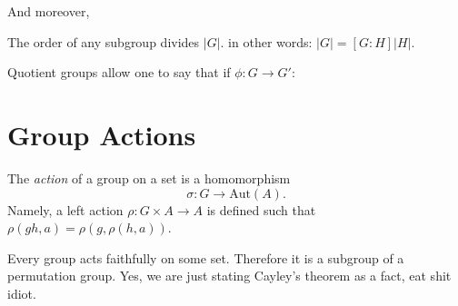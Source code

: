 \documentclass[12pt, twosided]{article}
\begin{document}
And moreover,
\begin{thm}
  The order of any subgroup divides \(|G|\). in other words:
  \(|G| = [G:H]|H|\).
\end{thm}

Quotient groups allow one to say that if \(\phi: G \to G\prime\):

\begin{center}
\end{center}

\section{Group Actions}

The \textit{action} of a group on a set is a homomorphism \[\sigma: G \to \mathrm{Aut}(A).\] Namely, a left action \(\rho: G \times A \to A\) is defined such that \(\rho(gh, a) = \rho(g, \rho(h, a))\).

\begin{fact}
  Every group acts faithfully on some set. Therefore it is a subgroup of a permutation group. Yes, we are just stating Cayley's theorem as a fact, eat shit idiot.
\end{fact}
\end{document}
